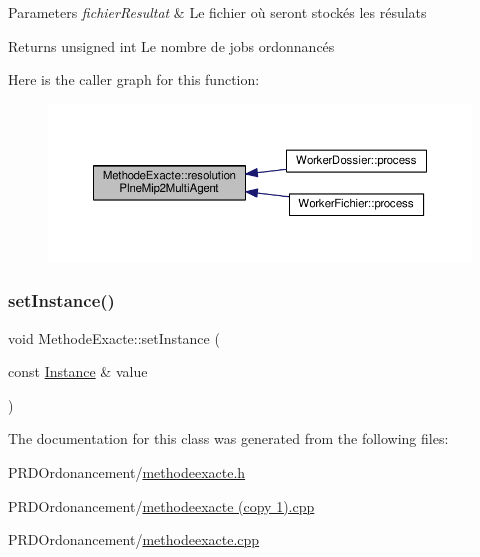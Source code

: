 \begin{DoxyParams}{Parameters}
{\em fichier\+Resultat} & Le fichier où seront stockés les résulats \\
\hline
\end{DoxyParams}
\begin{DoxyReturn}{Returns}
unsigned int Le nombre de jobs ordonnancés 
\end{DoxyReturn}
Here is the caller graph for this function\+:\nopagebreak
\begin{figure}[H]
\begin{center}
\leavevmode
\includegraphics[width=350pt]{classMethodeExacte_af5ed64d8d21ead081e02c3ac97192859_icgraph}
\end{center}
\end{figure}
\mbox{\label{classMethodeExacte_ae4a99972ce73ff50611a8842506723f9}} 
\subsubsection{\texorpdfstring{set\+Instance()}{setInstance()}}
{\footnotesize\ttfamily void Methode\+Exacte\+::set\+Instance (\begin{DoxyParamCaption}\item[{const \hyperlink{classInstance}{Instance} \&}]{value }\end{DoxyParamCaption})}



The documentation for this class was generated from the following files\+:\begin{DoxyCompactItemize}
\item 
P\+R\+D\+Ordonancement/\hyperlink{methodeexacte_8h}{methodeexacte.\+h}\item 
P\+R\+D\+Ordonancement/\hyperlink{methodeexacte_01_07copy_011_08_8cpp}{methodeexacte (copy 1).\+cpp}\item 
P\+R\+D\+Ordonancement/\hyperlink{methodeexacte_8cpp}{methodeexacte.\+cpp}\end{DoxyCompactItemize}
